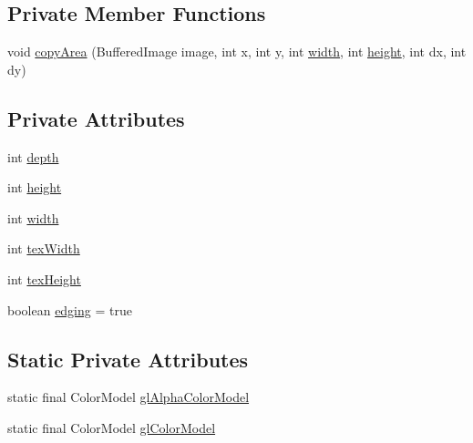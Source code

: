 \subsection*{Private Member Functions}
\begin{DoxyCompactItemize}
\item 
void \mbox{\hyperlink{classorg_1_1newdawn_1_1slick_1_1opengl_1_1_image_i_o_image_data_aa7ceedcc209c6fe2d1988afb2d082aa0}{copy\+Area}} (Buffered\+Image image, int x, int y, int \mbox{\hyperlink{classorg_1_1newdawn_1_1slick_1_1opengl_1_1_image_i_o_image_data_a4455bbf2c2f9c41df712d067260288f3}{width}}, int \mbox{\hyperlink{classorg_1_1newdawn_1_1slick_1_1opengl_1_1_image_i_o_image_data_af79cc456f73fe9b84d5803f4fb41348b}{height}}, int dx, int dy)
\end{DoxyCompactItemize}
\subsection*{Private Attributes}
\begin{DoxyCompactItemize}
\item 
int \mbox{\hyperlink{classorg_1_1newdawn_1_1slick_1_1opengl_1_1_image_i_o_image_data_a9732e4c418ef7044cb5ee44f1a6e5f69}{depth}}
\item 
int \mbox{\hyperlink{classorg_1_1newdawn_1_1slick_1_1opengl_1_1_image_i_o_image_data_af79cc456f73fe9b84d5803f4fb41348b}{height}}
\item 
int \mbox{\hyperlink{classorg_1_1newdawn_1_1slick_1_1opengl_1_1_image_i_o_image_data_a4455bbf2c2f9c41df712d067260288f3}{width}}
\item 
int \mbox{\hyperlink{classorg_1_1newdawn_1_1slick_1_1opengl_1_1_image_i_o_image_data_a2b79f8a3215961aed7f7be8196e14c75}{tex\+Width}}
\item 
int \mbox{\hyperlink{classorg_1_1newdawn_1_1slick_1_1opengl_1_1_image_i_o_image_data_a597e80bbf4e36c072de2b875ba4283c2}{tex\+Height}}
\item 
boolean \mbox{\hyperlink{classorg_1_1newdawn_1_1slick_1_1opengl_1_1_image_i_o_image_data_ae93f5c7af2aa1995c55cd584bf5e9735}{edging}} = true
\end{DoxyCompactItemize}
\subsection*{Static Private Attributes}
\begin{DoxyCompactItemize}
\item 
static final Color\+Model \mbox{\hyperlink{classorg_1_1newdawn_1_1slick_1_1opengl_1_1_image_i_o_image_data_a80bd17b614a20a6e5219c1c0405cb831}{gl\+Alpha\+Color\+Model}}
\item 
static final Color\+Model \mbox{\hyperlink{classorg_1_1newdawn_1_1slick_1_1opengl_1_1_image_i_o_image_data_a9601f68113edb6dd92818c5fa548d1f5}{gl\+Color\+Model}}
\end{DoxyCompactItemize}


